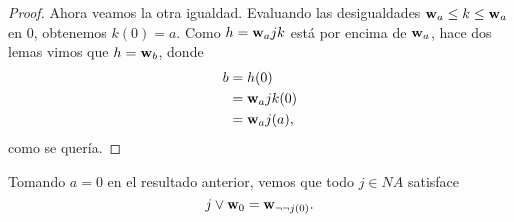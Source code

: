 \begin{proof}
    Ahora veamos la otra igualdad.
    Evaluando las desigualdades $\mathbf w_{a}\leq k\leq \mathbf w_{a}$
    en $0$, obtenemos $k(0)=a$.
    Como $h=\mathbf w_{a}jk$ está por encima de $\mathbf w_{a}$,
    hace dos lemas vimos que $h=\mathbf w_{b}$, donde
    \begin{align*}
        b
        &= h(0) \\
        &= \mathbf w_{a}jk(0) \\
        &= \mathbf w_{a}j(a),
    \end{align*}
    como se quería.
\end{proof}

\begin{cor}
    Tomando $a=0$ en el resultado anterior,
    vemos que todo $j\in NA$ satisface
    \[
        j\vee\mathbf w_{0} = \mathbf w_{\neg\neg j(0)}
    .\]
\end{cor}

